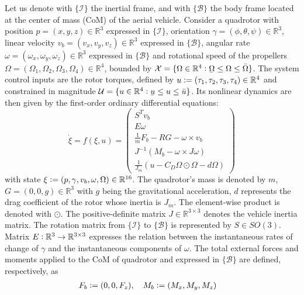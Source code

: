 Let us denote with $\{\mathcal{I}\}$ the inertial frame, and with $\{\mathcal{B}\}$ the body frame located at the center of mass (CoM) of the aerial vehicle. Consider a quadrotor with position $p = (x, y, z) \in \mathbb{R}^3$ expressed in $\{\mathcal{I}\}$, orientation $ \gamma = (\phi,\theta,\psi) \in \mathbb{R}^3$, linear velocity $v_b = (v_x, v_y, v_z) \in \mathbb{R}^3$ expressed in $\{\mathcal{B}\}$, angular rate $\omega = (\omega_x, \omega_y, \omega_z) \in \mathbb{R}^3$ expressed in $\{\mathcal{B}\}$ and rotational speed of the propellers $\Omega = (\Omega_1,\Omega_2,\Omega_3,\Omega_4) \in \mathbb{R}^4$, bounded by $\mathcal{X} = \{\Omega \in \mathbb{R}^4 \vcentcolon \ubar{\Omega} \leq \Omega \leq \Bar{\Omega}\}$. The system control inputs are the rotor torques, defined by $u \vcentcolon = (\tau_1,\tau_2,\tau_3,\tau_4) \in \mathbb{R}^4$ and constrained in magnitude $\mathcal{U} = \{u \in \mathbb{R}^4 \vcentcolon \ubar{u}\leq u \leq \Bar{u}\}$. Its nonlinear dynamics are then given by the first-order ordinary differential equations:
 \begin{equation}
 \dot{\xi} = f(\xi,u) = 
 \begin{pmatrix}
 	S^Tv_b \\
 	E \omega\\
	\frac{1}{m}F_b - R G - \omega\times v_b\\
	J^{-1}(M_b - \omega\times J\omega)\\
	\frac{1}{J_m}(u-C_D\Omega\odot\Omega-d\Omega)
\end{pmatrix}\label{eq:ode}%
 \end{equation}
 with state $\xi \vcentcolon = (p,\gamma,v_b,\omega,\Omega) \in \mathbb{R}^{16}$. The quadrotor's mass is denoted by $m$, $G =(0, 0, g) \in \mathbb{R}^3$ with $g$ being the gravitational acceleration, $d$ represents the drag coefficient of the rotor whose inertia is $J_m$. The element-wise product is denoted with $\odot$. The positive-definite matrix $J \in \mathbb{R}^{3 \times 3}$ denotes the vehicle inertia matrix. The rotation matrix from  $\{\mathcal{I}\}$ to $\{\mathcal{B}\}$ is represented by $S \in SO(3)$. Matrix $E \vcentcolon \mathbb{R}^3 \rightarrow \mathbb{R}^{3 \times 3}$ expresses the relation between the instantaneous rates of change of $\gamma$ and the instantaneous components of $\omega$. The total external forces and moments applied to the CoM of quadrotor and expressed in $\{\mathcal{B}\}$ are defined, respectively, as 
 \begin{equation}
 	\begin{aligned}
    F_b & \vcentcolon =  (0,0,F_z), \quad M_b \vcentcolon = (M_x, M_y, M_z)
	\end{aligned}
 \end{equation}
